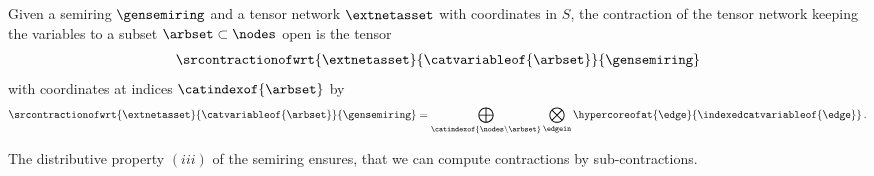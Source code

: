 
\begin{definition}
    Given a semiring $\gensemiring$ and a tensor network $\extnetasset$ with coordinates in $S$, the contraction of the tensor network keeping the variables to a subset $\arbset\subset\nodes$ open is the tensor
    \begin{align*}
        \srcontractionofwrt{
            \extnetasset
        }{\catvariableof{\arbset}}{\gensemiring}
    \end{align*}
    with coordinates at indices $\catindexof{\arbset}$ by
    \begin{align*}
        \srcontractionofwrt{
            \extnetasset
        }{\catvariableof{\arbset}}{\gensemiring}
        = \bigoplus_{\catindexof{\nodes\backslash\arbset}} \bigotimes_{\edgein} \hypercoreofat{\edge}{\indexedcatvariableof{\edge}} \, .
    \end{align*}
\end{definition}

The distributive property $(iii)$ of the semiring ensures, that we can compute contractions by sub-contractions.

